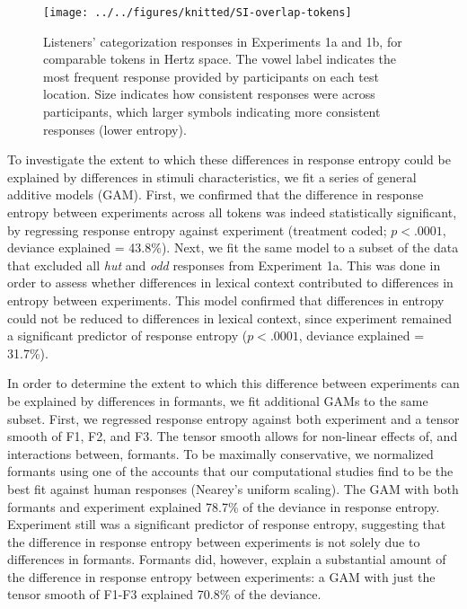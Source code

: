 \documentclass[preprint]{JASA}
\begin{document}
\begin{figure}

{\centering \texttt{[image: ../../figures/knitted/SI-overlap-tokens]} 

}

\caption{Listeners' categorization responses in Experiments 1a and 1b, for comparable tokens in Hertz space. The vowel label indicates the most frequent response provided by participants on each test location. Size indicates how consistent responses were across participants, which larger symbols indicating more consistent responses (lower entropy).}\label{fig:SI-overlap-tokens}
\end{figure}

To investigate the extent to which these differences in response entropy could be explained by differences in stimuli characteristics, we fit a series of general additive models (GAM). First, we confirmed that the difference in response entropy between experiments across all tokens was indeed statistically significant, by regressing response entropy against experiment (treatment coded; \(p < .0001\), deviance explained = 43.8\%). Next, we fit the same model to a subset of the data that excluded all \emph{hut} and \emph{odd} responses from Experiment 1a. This was done in order to assess whether differences in lexical context contributed to differences in entropy between experiments. This model confirmed that differences in entropy could not be reduced to differences in lexical context, since experiment remained a significant predictor of response entropy (\(p < .0001\), deviance explained = 31.7\%).

In order to determine the extent to which this difference between experiments can be explained by differences in formants, we fit additional GAMs to the same subset. First, we regressed response entropy against both experiment and a tensor smooth of F1, F2, and F3. The tensor smooth allows for non-linear effects of, and interactions between, formants. To be maximally conservative, we normalized formants using one of the accounts that our computational studies find to be the best fit against human responses (Nearey's uniform scaling). The GAM with both formants and experiment explained 78.7\% of the deviance in response entropy. Experiment still was a significant predictor of response entropy, suggesting that the difference in response entropy between experiments is not solely due to differences in formants. Formants did, however, explain a substantial amount of the difference in response entropy between experiments: a GAM with just the tensor smooth of F1-F3 explained 70.8\% of the deviance.
\end{document}
